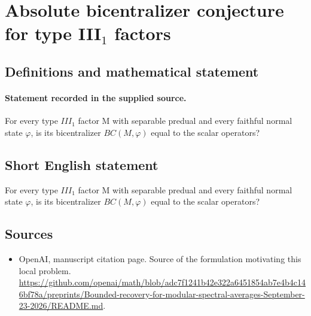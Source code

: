 \documentclass[11pt]{article}
\begin{document}
\section*{Absolute bicentralizer conjecture for type III$_1$ factors}\label{statement}
\subsection{Definitions and mathematical statement}
\paragraph{Statement recorded in the supplied source.}
For every type $III_{1}$ factor M with separable predual and every faithful normal state $\varphi $, is its bicentralizer $BC(M,\varphi )$ equal to the scalar operators?
\subsection{Short English statement}
For every type $III_{1}$ factor M with separable predual and every faithful normal state $\varphi $, is its bicentralizer $BC(M,\varphi )$ equal to the scalar operators?
\subsection{Sources}
\begin{itemize}
\item[S1] OpenAI, manuscript citation page. Source of the formulation motivating this local problem.
\url{https://github.com/openai/math/blob/adc7f1241b42e322a6451854ab7e4b4c146bf78a/preprints/Bounded-recovery-for-modular-spectral-averages-September-23-2026/README.md}.
\end{itemize}
\end{document}
